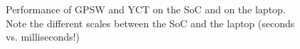 \begin{figure}[h]
    \caption[Performance of ABE schemes on the SoC and laptop]{Performance of GPSW and YCT on the SoC and on the laptop. Note the different scales between the SoC and the laptop (seconds vs. milliseconds!)}
    \label{fig:abe-performance-diagrams}
\end{figure}